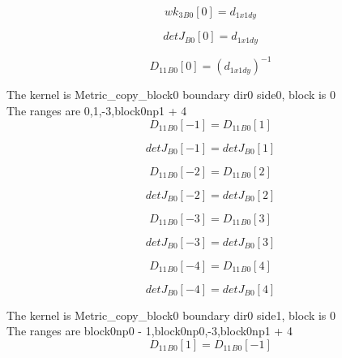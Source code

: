 \documentclass{article}
\begin{document}
\begin{dmath}{wk_{3}{_{B0}}}[{0}] = d_{1 x1 dy}\end{dmath}

\begin{dmath}{detJ{_{B0}}}[{0}] = d_{1 x1 dy}\end{dmath}

\begin{dmath}{D_{11}{_{B0}}}[{0}] = \left(d_{1 x1 dy} \right)^{-1}\end{dmath}

\noindent The kernel is Metric_copy_block0 boundary dir0 side0, block is 0\\\noindent The ranges are 0,1,-3,block0np1 + 4\\\begin{dmath}{D_{11}{_{B0}}}[{-1}] = {D_{11}{_{B0}}}[{1}]\end{dmath}

\begin{dmath}{detJ{_{B0}}}[{-1}] = {detJ{_{B0}}}[{1}]\end{dmath}

\begin{dmath}{D_{11}{_{B0}}}[{-2}] = {D_{11}{_{B0}}}[{2}]\end{dmath}

\begin{dmath}{detJ{_{B0}}}[{-2}] = {detJ{_{B0}}}[{2}]\end{dmath}

\begin{dmath}{D_{11}{_{B0}}}[{-3}] = {D_{11}{_{B0}}}[{3}]\end{dmath}

\begin{dmath}{detJ{_{B0}}}[{-3}] = {detJ{_{B0}}}[{3}]\end{dmath}

\begin{dmath}{D_{11}{_{B0}}}[{-4}] = {D_{11}{_{B0}}}[{4}]\end{dmath}

\begin{dmath}{detJ{_{B0}}}[{-4}] = {detJ{_{B0}}}[{4}]\end{dmath}

\noindent The kernel is Metric_copy_block0 boundary dir0 side1, block is 0\\\noindent The ranges are block0np0 - 1,block0np0,-3,block0np1 + 4\\\begin{dmath}{D_{11}{_{B0}}}[{1}] = {D_{11}{_{B0}}}[{-1}]\end{dmath}
\end{document}
